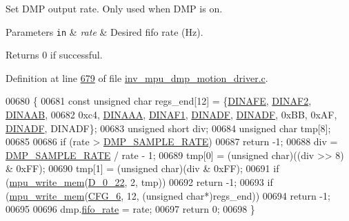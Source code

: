 Set D\+MP output rate. Only used when D\+MP is on. 


\begin{DoxyParams}[1]{Parameters}
\mbox{\tt in}  & {\em rate} & Desired fifo rate (Hz). \\
\hline
\end{DoxyParams}
\begin{DoxyReturn}{Returns}
0 if successful. 
\end{DoxyReturn}


Definition at line \hyperlink{inv__mpu__dmp__motion__driver_8c_source_l00679}{679} of file \hyperlink{inv__mpu__dmp__motion__driver_8c_source}{inv\+\_\+mpu\+\_\+dmp\+\_\+motion\+\_\+driver.\+c}.


\begin{DoxyCode}
00680 \{
00681     \textcolor{keyword}{const} \textcolor{keywordtype}{unsigned} \textcolor{keywordtype}{char} regs\_end[12] = \{\hyperlink{dmp_key_8h_a371499e1b724b447dfd2293c3567b5bb}{DINAFE}, \hyperlink{dmp_key_8h_a02164a87762ad628851cb75fb3862e64}{DINAF2}, \hyperlink{dmp_key_8h_a6afb3fa4c11350dbd2ab8cb2a486d441}{DINAAB},
00682         0xc4, \hyperlink{dmp_key_8h_adc43f6e3194e06db0cb9ef1d76fc75fa}{DINAAA}, \hyperlink{dmp_key_8h_aaa9602f10af03cf274745cf22ec87667}{DINAF1}, \hyperlink{dmp_key_8h_adc331c8f66eebd5902aaa688b2f92999}{DINADF}, \hyperlink{dmp_key_8h_adc331c8f66eebd5902aaa688b2f92999}{DINADF}, 0xBB, 0xAF, 
      \hyperlink{dmp_key_8h_adc331c8f66eebd5902aaa688b2f92999}{DINADF}, DINADF\};
00683     \textcolor{keywordtype}{unsigned} \textcolor{keywordtype}{short} div;
00684     \textcolor{keywordtype}{unsigned} \textcolor{keywordtype}{char} tmp[8];
00685 
00686     \textcolor{keywordflow}{if} (rate > \hyperlink{group___d_r_i_v_e_r_s_ga9d0f0425cbcb58186500cb8686e41e67}{DMP\_SAMPLE\_RATE})
00687         \textcolor{keywordflow}{return} -1;
00688     div = \hyperlink{group___d_r_i_v_e_r_s_ga9d0f0425cbcb58186500cb8686e41e67}{DMP\_SAMPLE\_RATE} / rate - 1;
00689     tmp[0] = (\textcolor{keywordtype}{unsigned} char)((div >> 8) & 0xFF);
00690     tmp[1] = (\textcolor{keywordtype}{unsigned} char)(div & 0xFF);
00691     \textcolor{keywordflow}{if} (\hyperlink{group___d_r_i_v_e_r_s_gafea59910bc3dd30ba3356b1c75213a5f}{mpu\_write\_mem}(\hyperlink{group___d_r_i_v_e_r_s_ga155b1481095edac7a26c8c3d5b9c5a24}{D\_0\_22}, 2, tmp))
00692         \textcolor{keywordflow}{return} -1;
00693     \textcolor{keywordflow}{if} (\hyperlink{group___d_r_i_v_e_r_s_gafea59910bc3dd30ba3356b1c75213a5f}{mpu\_write\_mem}(\hyperlink{group___d_r_i_v_e_r_s_ga40938f669c5b33b4316a7a5fba679eba}{CFG\_6}, 12, (\textcolor{keywordtype}{unsigned} \textcolor{keywordtype}{char}*)regs\_end))
00694         \textcolor{keywordflow}{return} -1;
00695 
00696     dmp.\hyperlink{structdmp__s_a4aec83107ddc0d95ddf30cce1b7e6465}{fifo\_rate} = rate;
00697     \textcolor{keywordflow}{return} 0;
00698 \}
\end{DoxyCode}
